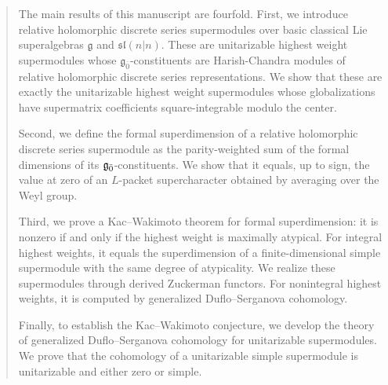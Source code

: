 \documentclass[11pt]{amsart}
\begin{document}
\thispagestyle{empty}


\begin{abstract}
The main results of this manuscript are fourfold. First, we introduce relative holomorphic discrete series supermodules over basic classical Lie superalgebras $\mathfrak{g}$ and $\mathfrak{sl}(n\vert n)$. These are unitarizable highest weight supermodules whose $\mathfrak{g}_{\bar{0}}$-constituents are Harish-Chandra modules of relative holomorphic discrete series representations. We show that these are exactly the unitarizable highest weight supermodules whose globalizations have supermatrix coefficients square-integrable modulo the center.

 Second, we define the formal superdimension of a relative holomorphic discrete series supermodule as the parity-weighted sum of the formal dimensions of its $\even$-constituents. We show that it equals, up to sign, the value at zero of an $L$-packet supercharacter obtained by averaging over the Weyl group.

Third, we prove a Kac--Wakimoto theorem for formal superdimension: it is nonzero if and only if the highest weight is maximally atypical. For integral highest weights, it equals the superdimension of a finite-dimensional simple supermodule with the same degree of atypicality. We realize these supermodules through derived Zuckerman functors. For nonintegral highest weights, it is computed by generalized Duflo--Serganova cohomology.

Finally, to establish the Kac--Wakimoto conjecture, we develop the theory of generalized Duflo--Serganova cohomology for unitarizable supermodules. We prove that the cohomology of a unitarizable simple supermodule is unitarizable and either zero or simple.
\end{abstract}

\maketitle

\setlength{\parindent}{1em}
\setcounter{tocdepth}{2}
\tableofcontents





\end{document}
